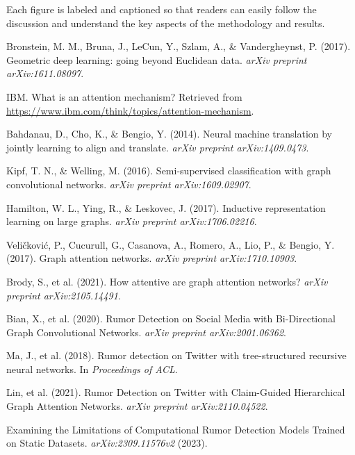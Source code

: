 \documentclass[12pt,a4paper]{report}
\begin{document}
Each figure is labeled and captioned so that readers can easily follow the discussion and understand the key aspects of the methodology and results.

\newpage

\begin{thebibliography}{99}

Bronstein, M. M., Bruna, J., LeCun, Y., Szlam, A., \& Vandergheynst, P. (2017).
\newblock Geometric deep learning: going beyond Euclidean data.
\newblock \emph{arXiv preprint arXiv:1611.08097}.

IBM.
\newblock What is an attention mechanism?
\newblock Retrieved from \url{https://www.ibm.com/think/topics/attention-mechanism}.

Bahdanau, D., Cho, K., \& Bengio, Y. (2014).
\newblock Neural machine translation by jointly learning to align and translate.
\newblock \emph{arXiv preprint arXiv:1409.0473}.

Kipf, T. N., \& Welling, M. (2016).
\newblock Semi-supervised classification with graph convolutional networks.
\newblock \emph{arXiv preprint arXiv:1609.02907}.

Hamilton, W. L., Ying, R., \& Leskovec, J. (2017).
\newblock Inductive representation learning on large graphs.
\newblock \emph{arXiv preprint arXiv:1706.02216}.

Veličković, P., Cucurull, G., Casanova, A., Romero, A., Lio, P., \& Bengio, Y. (2017).
\newblock Graph attention networks.
\newblock \emph{arXiv preprint arXiv:1710.10903}.

Brody, S., et al. (2021).
\newblock How attentive are graph attention networks?
\newblock \emph{arXiv preprint arXiv:2105.14491}.

Bian, X., et al. (2020).
\newblock Rumor Detection on Social Media with Bi-Directional Graph Convolutional Networks.
\newblock \emph{arXiv preprint arXiv:2001.06362}.

Ma, J., et al. (2018).
\newblock Rumor detection on Twitter with tree-structured recursive neural networks.
\newblock In \emph{Proceedings of ACL}.

Lin, et al. (2021).
\newblock Rumor Detection on Twitter with Claim-Guided Hierarchical Graph Attention Networks.
\newblock \emph{arXiv preprint arXiv:2110.04522}.

Examining the Limitations of Computational Rumor Detection Models Trained on Static Datasets.
\newblock \emph{arXiv:2309.11576v2} (2023).


\end{thebibliography}
\end{document}

